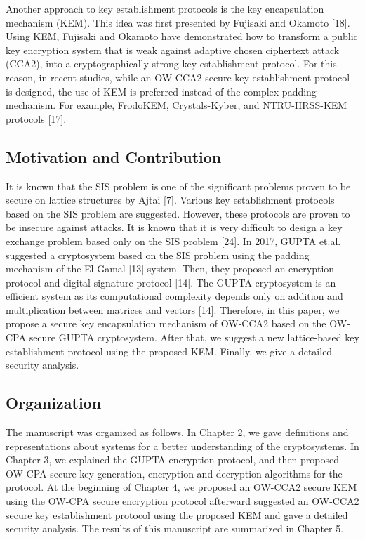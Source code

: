 \documentclass[a4paper,fleqn]{cas-dc}
\begin{document}
	Another approach to key establishment protocols is the key encapsulation mechanism (KEM). This idea was first presented by Fujisaki and Okamoto [18]. Using KEM, Fujisaki and Okamoto have demonstrated how to transform a public key encryption system that is weak against adaptive chosen ciphertext attack (CCA2), into a cryptographically strong key establishment protocol. For this reason, in recent studies, while an OW-CCA2 secure key establishment protocol is designed, the use of KEM is preferred instead of the complex padding mechanism. For example, FrodoKEM, Crystals-Kyber, and NTRU-HRSS-KEM protocols [17].

\subsection{Motivation and Contribution}

	It is known that the SIS problem is one of the significant problems proven to be secure on lattice structures by Ajtai [7]. Various key establishment protocols based on the SIS problem are suggested. However, these protocols are proven to be insecure against attacks. It is known that it is very difficult to design a key exchange problem based only on the SIS problem [24].  In 2017, GUPTA  et.al. suggested a cryptosystem based on the SIS problem using the padding mechanism of the El-Gamal [13] system. Then, they proposed an encryption protocol and digital signature protocol [14]. The GUPTA cryptosystem is an efficient system as its computational complexity depends only on addition and multiplication between matrices and vectors [14]. Therefore, in this paper, we propose a secure key encapsulation mechanism of OW-CCA2 based on the OW-CPA secure GUPTA cryptosystem. After that, we suggest a new lattice-based key establishment protocol using the proposed KEM. Finally, we give a detailed security analysis.
\subsection{Organization}

	The manuscript was organized as follows. In Chapter 2, we gave definitions and representations about systems for a better understanding of the cryptosystems. In Chapter 3, we explained the GUPTA encryption protocol, and then proposed OW-CPA secure key generation, encryption and decryption algorithms for the protocol. At the beginning of Chapter 4, we proposed an OW-CCA2 secure KEM using the OW-CPA secure encryption protocol afterward suggested an OW-CCA2 secure key establishment protocol using the proposed KEM and gave a detailed security analysis. The results of this manuscript are summarized in Chapter 5.
\end{document}

